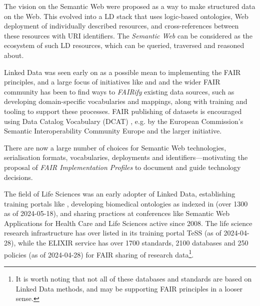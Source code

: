 The vision on the Semantic Web \cite{Berners-Lee 1999} were proposed as a way to make structured data on the Web. This evolved into a \acrfull{LD} stack that uses logic-based ontologies, Web deployment of individually described resources, and cross-references between these resources with \acrfull{URI} identifiers. The \emph{Semantic Web} can be considered as the ecosystem of such \acrlong{LD} resources, which can be queried, traversed and reasoned about. 

Linked Data was seen early on as a possible mean to implementing the FAIR principles, and a large focus of initiatives like  and  and the wider FAIR community has been to find ways to \emph{FAIRify} existing data sources, such as developing domain-specific vocabularies and mappings, along with training and tooling to support these processes. FAIR publishing of datasets is encouraged using Data Catalog Vocabulary (DCAT) \cite{Albertoni 2023}, e.g. by the European Commission's Semantic Interoperability Community Europe  and the larger  initiative.

There are now a large number of choices for Semantic Web technologies, serialisation formats, vocabularies, deployments and identifiers---motivating the proposal of \emph{FAIR Implementation Profiles} \cite{Schultes 2020} to document and guide technology decisions. 

The field of Life Sciences was an early adopter of Linked Data, establishing training portals like  \cite{Rocca-Serra 2023}, developing biomedical ontologies as indexed in  \cite{Whetzel 2011} (over 1300 as of 2024-05-18), and sharing practices at conferences like Semantic Web Applications for Health Care and Life Sciences  active since 2008.
The life science research infrastructure  has over  listed in its training portal TeSS (as of 2024-04-28), while the ELIXIR service  \cite{Sansone 2019} has over 1700 standards, 2100 databases and 250 policies (as of 2024-04-28) for FAIR sharing of research data\footnote{It is worth noting that not all of these databases and standards are based on Linked Data methods, and may be supporting FAIR principles in a looser sense.}. 

